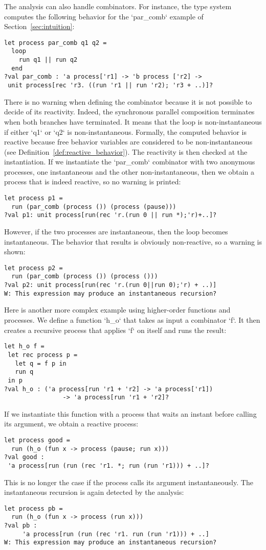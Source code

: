 \documentclass[9pt,preprint]{sigplanconf}
\begin{document}
The analysis can also handle combinators. For instance, the type system computes the following behavior for the `par_comb` example of Section~\ref{sec:intuition}:
\begin{lstlisting}
let process par_comb q1 q2 =
  loop
    run q1 || run q2
  end
?val par_comb : 'a process['r1] -> 'b process ['r2] ->
 unit process[rec 'r3. ((run 'r1 || run 'r2); 'r3 + ..)]?
\end{lstlisting}
%
There is no warning when defining the combinator because it is not possible to decide of its reactivity. Indeed, the synchronous parallel composition terminates when both branches have terminated. It means that the loop is non-instantaneous if either `q1` or `q2` is non-instantaneous. Formally, the computed behavior is reactive because free behavior variables are considered to be non-instantaneous (see Definition~\ref{def:reactive_behavior}). The reactivity is then checked at the instantiation. If we instantiate the `par_comb` combinator with two anonymous processes, one instantaneous and the other non-instantaneous, then we obtain a process that is indeed reactive, so no warning is printed:
\begin{lstlisting}
let process p1 = 
  run (par_comb (process ()) (process (pause)))
?val p1: unit process[run(rec 'r.(run 0 || run *);'r)+..]?
\end{lstlisting}
However, if the two processes are instantaneous, then the loop becomes instantaneous. The behavior that results is obviously non-reactive, so a warning is shown:
\begin{lstlisting}
let process p2 = 
  run (par_comb (process ()) (process ()))
?val p2: unit process[run(rec 'r.(run 0||run 0);'r) + ..)]
W: This expression may produce an instantaneous recursion?
\end{lstlisting}

Here is another more complex example using higher-order functions and processes. We define a function `h_o` that takes as input a combinator `f`. It then creates a recursive process that applies `f` on itself and runs the result:
\begin{lstlisting}
let h_o f =
 let rec process p =
   let q = f p in
   run q
 in p
?val h_o : ('a process[run 'r1 + 'r2] -> 'a process['r1]) 
                -> 'a process[run 'r1 + 'r2]?
\end{lstlisting}
If we instantiate this function with a process that waits an instant before calling its argument, we obtain a reactive process:
\begin{lstlisting}
let process good = 
  run (h_o (fun x -> process (pause; run x)))
?val good :
 'a process[run (run (rec 'r1. *; run (run 'r1))) + ..]?
\end{lstlisting}
This is no longer the case if the process calls its argument instantaneously. The instantaneous recursion is again detected by the analysis:
\begin{lstlisting}
let process pb = 
  run (h_o (fun x -> process (run x)))
?val pb : 
     'a process[run (run (rec 'r1. run (run 'r1))) + ..]
W: This expression may produce an instantaneous recursion?
\end{lstlisting}
\end{document}
